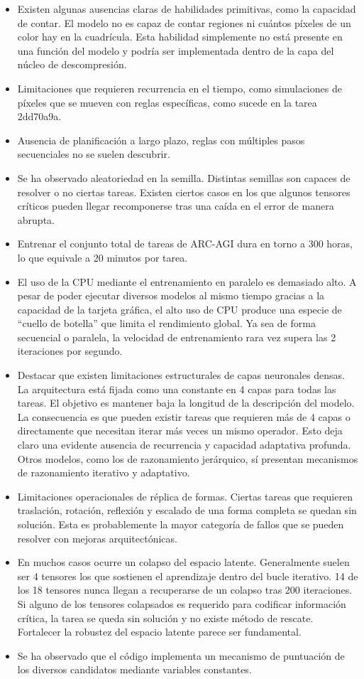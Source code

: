 \documentclass[11pt,a4paper,spanish]{book}
\numberwithin{equation}{chapter}
\numberwithin{figure}{chapter}
\begin{document}
\begin{itemize}
	\item Existen algunas ausencias claras de habilidades primitivas, como la capacidad de contar. El modelo no es capaz de contar
	regiones ni cuántos píxeles de un color hay en la cuadrícula. Esta habilidad simplemente no está presente en una función del modelo y
	podría ser implementada dentro de la capa del núcleo de descompresión.
	\item Limitaciones que requieren recurrencia en el tiempo, como simulaciones de píxeles que se mueven con reglas específicas, como sucede en la tarea
	2dd70a9a.
	\item Ausencia de planificación a largo plazo, reglas con múltiples pasos secuenciales no se suelen descubrir.
	\item Se ha observado aleatoriedad en la semilla. Distintas semillas son capaces de resolver o no ciertas tareas. Existen ciertos casos
	en los que algunos tensores críticos pueden llegar recomponerse tras una caída en el error de manera abrupta.
	\item Entrenar el conjunto total de tareas de ARC-AGI dura en torno a 300 horas, lo que equivale a 20 minutos por tarea.
	\item El uso de la CPU mediante el entrenamiento en paralelo es demasiado alto. A pesar de poder ejecutar diversos modelos al mismo tiempo
	gracias a la capacidad de la tarjeta gráfica, el alto uso de CPU produce una especie de ``cuello de botella'' que limita el rendimiento global.
	Ya sea de forma secuencial o paralela, la velocidad de entrenamiento rara vez supera las 2 iteraciones por segundo.
	\item Destacar que existen limitaciones estructurales de capas neuronales densas. La arquitectura está fijada como una constante en 4 capas
	para todas las tareas. El objetivo es mantener baja la longitud de la descripción del modelo. La consecuencia es que pueden existir
	tareas que requieren más de 4 capas o directamente que necesitan iterar más veces un mismo operador. Esto deja claro una evidente ausencia de recurrencia
	y capacidad adaptativa profunda. Otros modelos, como los de razonamiento jerárquico, sí presentan mecanismos de razonamiento iterativo
	y adaptativo.
	\item Limitaciones operacionales de réplica de formas. Ciertas tareas que requieren traslación, rotación, reflexión y escalado de una forma completa
	se quedan sin solución. Esta es probablemente la mayor categoría de fallos que se pueden resolver con mejoras arquitectónicas.
	\item En muchos casos ocurre un colapso del espacio latente. Generalmente suelen ser 4 tensores los que sostienen el aprendizaje dentro del
	bucle iterativo. 14 de los 18 tensores nunca llegan a recuperarse de un colapso tras 200 iteraciones. Si alguno de los tensores colapsados es
	requerido para codificar información crítica, la tarea se queda sin solución y no existe método de rescate. Fortalecer la robustez del
	espacio latente parece ser fundamental.
	\item Se ha observado que el código implementa un mecanismo de puntuación de los diversos candidatos mediante variables constantes.
\end{itemize}
\end{document}
